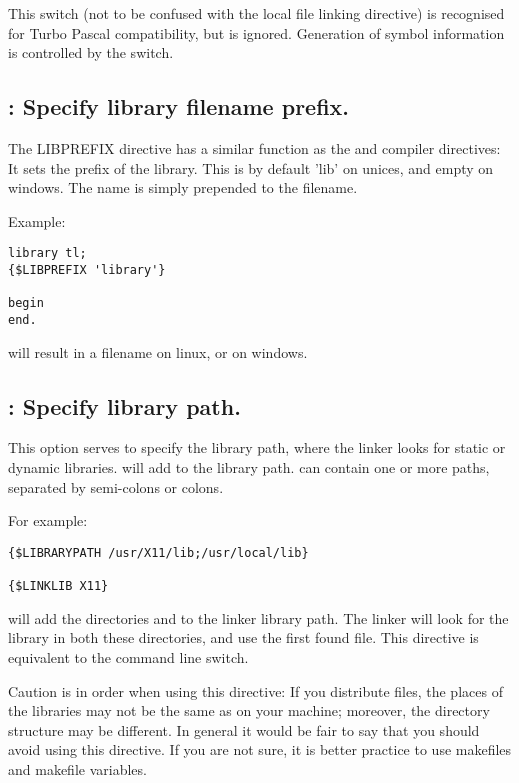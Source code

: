 This switch (not to be confused with the local  file linking
directive) is recognised for Turbo Pascal compatibility, but is ignored.
Generation of symbol information is controlled by the  switch.

\subsection{ : Specify library filename prefix.}
The LIBPREFIX directive has a similar function as the  and
 compiler directives: It sets the prefix of the library. 
This is by default 'lib' on unices, and empty on windows. The name is simply
prepended to the filename.

Example:
\begin{verbatim}
library tl;
{$LIBPREFIX 'library'}

begin
end.
\end{verbatim}
will result in a filename  on linux, or
 on windows.


\subsection{ : Specify library path.}

This option serves to specify the library path, where the linker looks for
static or dynamic libraries.  will add 
to the library path.  can contain one or more paths, separated
by semi-colons or colons.

For example:
\begin{verbatim}
{$LIBRARYPATH /usr/X11/lib;/usr/local/lib}

{$LINKLIB X11}
\end{verbatim}

will add the directories  and  to
the linker library path. The linker will look for the library 
in both these directories, and use the first found file. This directive is
equivalent to the  command line switch.

Caution is in order when using this directive: If you distribute files, the
places of the libraries may not be the same as on your machine; moreover, the
directory structure may be different. In general it would be fair to say
that you should avoid using this directive. If you are not sure, it is better
practice to use makefiles and makefile variables.

